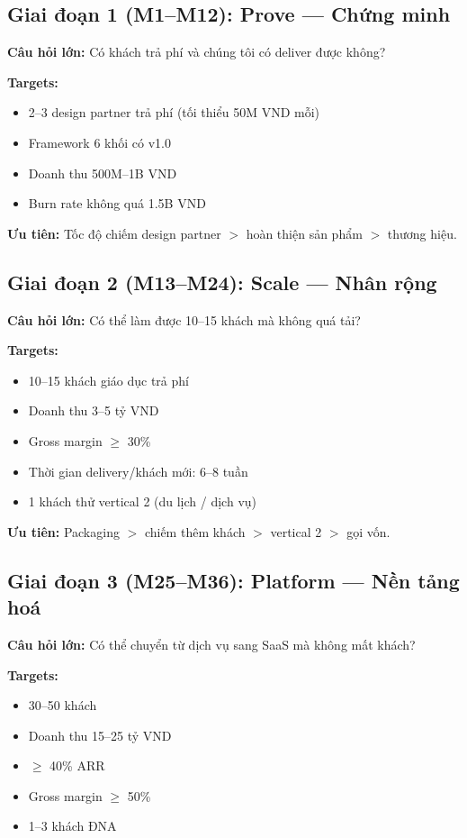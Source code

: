 \documentclass[11pt,a4paper]{article}
\begin{document}
\subsection{Giai đoạn 1 (M1--M12): Prove --- Chứng minh}

\textbf{Câu hỏi lớn:} Có khách trả phí và chúng tôi có deliver được không?

\textbf{Targets:}
\begin{itemize}
\item 2--3 design partner trả phí (tối thiểu 50M VND mỗi)
\item Framework 6 khối có v1.0
\item Doanh thu 500M--1B VND
\item Burn rate không quá 1.5B VND
\end{itemize}

\textbf{Ưu tiên:} Tốc độ chiếm design partner $>$ hoàn thiện sản phẩm $>$ thương hiệu.

\subsection{Giai đoạn 2 (M13--M24): Scale --- Nhân rộng}

\textbf{Câu hỏi lớn:} Có thể làm được 10--15 khách mà không quá tải?

\textbf{Targets:}
\begin{itemize}
\item 10--15 khách giáo dục trả phí
\item Doanh thu 3--5 tỷ VND
\item Gross margin $\geq$ 30\%
\item Thời gian delivery/khách mới: 6--8 tuần
\item 1 khách thử vertical 2 (du lịch / dịch vụ)
\end{itemize}

\textbf{Ưu tiên:} Packaging $>$ chiếm thêm khách $>$ vertical 2 $>$ gọi vốn.

\subsection{Giai đoạn 3 (M25--M36): Platform --- Nền tảng hoá}

\textbf{Câu hỏi lớn:} Có thể chuyển từ dịch vụ sang SaaS mà không mất khách?

\textbf{Targets:}
\begin{itemize}
\item 30--50 khách
\item Doanh thu 15--25 tỷ VND
\item $\geq$ 40\% ARR
\item Gross margin $\geq$ 50\%
\item 1--3 khách ĐNA
\end{itemize}
\end{document}
